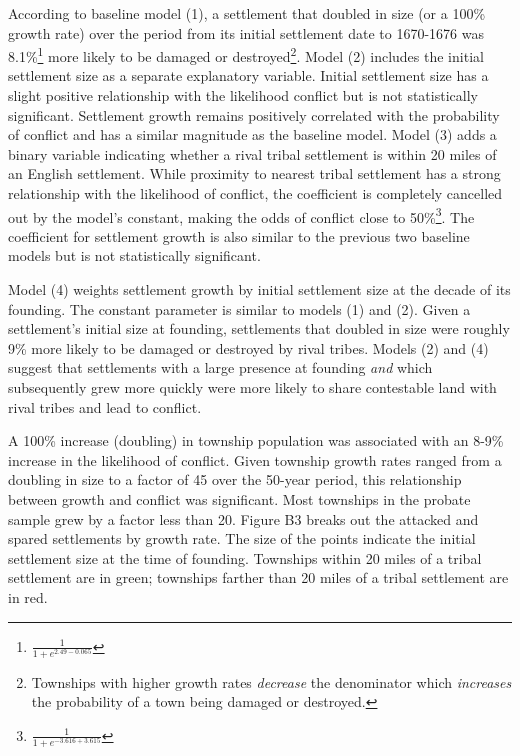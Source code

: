 \documentclass[sn-mathphys]{sn-jnl}%
\theoremstyle{thmstyleone}%
\theoremstyle{thmstyletwo}%
\theoremstyle{thmstylethree}%
\begin{document}
According to baseline model (1), a settlement that doubled in size (or a 100\% growth rate) over the period from its initial settlement date to 1670-1676 was 8.1\%\footnote{$\frac{1}{1+e^{2.49-0.065}}$} more likely to be damaged or destroyed\footnote{Townships with higher growth rates \textit{decrease} the denominator which \textit{increases} the probability of a town being damaged or destroyed.}. %
Model (2) includes the initial settlement size as a separate explanatory variable. Initial settlement size has a slight positive relationship with the likelihood conflict but is not statistically significant. Settlement growth remains positively correlated with the probability of conflict and has a similar magnitude as the baseline model. Model (3) adds a binary variable indicating whether a rival tribal settlement is within 20 miles of an English settlement. While proximity to nearest tribal settlement has a strong relationship with the likelihood of conflict, the coefficient is completely cancelled out by the model's constant, making the odds of conflict close to 50\%\footnote{$\frac{1}{1+e^{-3.616+3.615}}$}. The coefficient for settlement growth is also similar to the previous two baseline models but is not statistically significant.

Model (4) weights settlement growth by initial settlement size at the decade of its founding. The constant parameter is similar to models (1) and (2). Given a settlement's initial size at founding, settlements that doubled in size were roughly 9\% more likely to be damaged or destroyed by rival tribes. Models (2) and (4) suggest that settlements with a large presence at founding {\em and} which subsequently grew more quickly were more likely to share contestable land with rival tribes and lead to conflict. 

A 100\% increase (doubling) in township population was associated with an 8-9\% increase in the likelihood of conflict. Given township growth rates ranged from a doubling in size to a factor of 45 over the 50-year period, this relationship between growth and conflict was significant. Most townships in the probate sample grew by a factor less than 20. Figure B3 breaks out the attacked and spared settlements by growth rate. The size of the points indicate the initial settlement size at the time of founding. Townships within 20 miles of a tribal settlement are in green; townships farther than 20 miles of a tribal settlement are in red.
\end{document}
